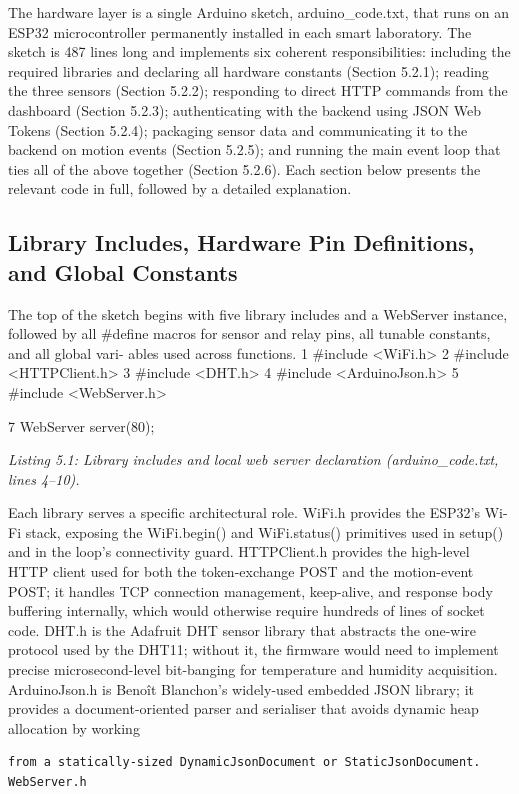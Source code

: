 The hardware layer is a single Arduino sketch, arduino\_code.txt, that runs on an ESP32
microcontroller permanently installed in each smart laboratory. The sketch is 487 lines long
and implements six coherent responsibilities: including the required libraries and declaring
all hardware constants (Section 5.2.1); reading the three sensors (Section 5.2.2); responding to direct HTTP commands from the dashboard (Section 5.2.3); authenticating with the
backend using JSON Web Tokens (Section 5.2.4); packaging sensor data and communicating it to the backend on motion events (Section 5.2.5); and running the main event loop that
ties all of the above together (Section 5.2.6). Each section below presents the relevant code
in full, followed by a detailed explanation.




\subsection{Library Includes, Hardware Pin Deﬁnitions, and Global Constants}


The top of the sketch begins with ﬁve library includes and a WebServer instance, followed
by all \#define macros for sensor and relay pins, all tunable constants, and all global vari-
ables used across functions.
1 \#include <WiFi.h>
2 \#include <HTTPClient.h>
3 \#include <DHT.h>
4 \#include <ArduinoJson.h>
5 \#include <WebServer.h>

7 WebServer server(80);



\textit{Listing 5.1: Library includes and local web server declaration (arduino\_code.txt, lines 4--10).}



Each library serves a speciﬁc architectural role. WiFi.h provides the ESP32's Wi-Fi
stack, exposing the WiFi.begin() and WiFi.status() primitives used in setup() and
in the loop's connectivity guard. HTTPClient.h provides the high-level HTTP client used
for both the token-exchange POST and the motion-event POST; it handles TCP connection
management, keep-alive, and response body buffering internally, which would otherwise
require hundreds of lines of socket code. DHT.h is the Adafruit DHT sensor library that
abstracts the one-wire protocol used by the DHT11; without it, the ﬁrmware would need to
implement precise microsecond-level bit-banging for temperature and humidity acquisition.
ArduinoJson.h is Benoît Blanchon's widely-used embedded JSON library; it provides a
document-oriented parser and serialiser that avoids dynamic heap allocation by working
\begin{lstlisting}
from a statically-sized DynamicJsonDocument or StaticJsonDocument. WebServer.h
\end{lstlisting}

